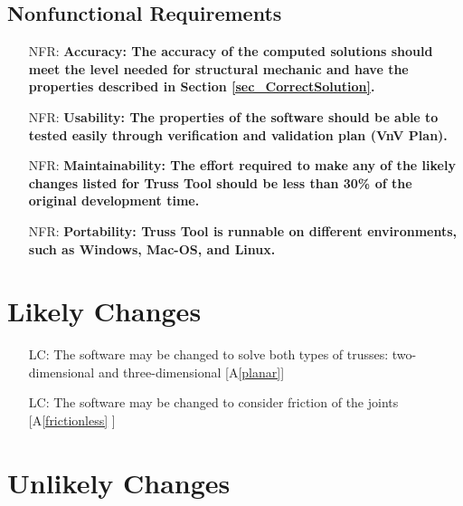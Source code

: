 \documentclass[12pt]{article}
\newcommand{\aref}[1]{A\ref{#1}}
\newcounter{nfrnum} %
\newcounter{lcnum} %
\begin{document}
\subsection{Nonfunctional Requirements}



\noindent \begin{itemize}

\item[NFR\refstepcounter{nfrnum}\thenfrnum \label{NFR_Accuracy}:]
  \textbf{Accuracy: The accuracy of the computed solutions should meet the level needed for
structural mechanic and have the properties described in Section \ref{sec_CorrectSolution}.}
 
\item[NFR\refstepcounter{nfrnum}\thenfrnum \label{NFR_Usability}:] \textbf{Usability: The properties of the software should be able to tested easily through
verification and validation plan (VnV Plan).}
 

\item[NFR\refstepcounter{nfrnum}\thenfrnum \label{NFR_Maintainability}:]
  \textbf{Maintainability: The effort required to make any of the likely    changes listed for Truss Tool should be less than 30\% of the original    development time.}

\item[NFR\refstepcounter{nfrnum}\thenfrnum \label{NFR_Portability}:]
  \textbf{Portability:  Truss Tool is runnable on different environments, such as Windows, Mac-OS, and Linux.} 

\end{itemize}

\section{Likely Changes}    

\noindent \begin{itemize}

\item[LC\refstepcounter{lcnum}\thelcnum\label{LC_planar}:] The software may be changed to solve both types of trusses: two-dimensional and three-dimensional [\aref{planar}]  
\item[LC\refstepcounter{lcnum}\thelcnum\label{LC_friction}:] The software may be changed to consider friction of the joints [\aref{frictionless} ]

\end{itemize}

\section{Unlikely Changes}    
\end{document}
